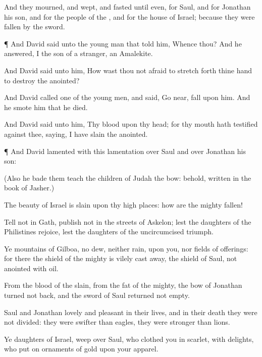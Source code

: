{And they
mourned, and
wept, and
fasted until
even, for
Saul, and for
Jonathan his
son, and for the
people of the
{}, and for the
house of
Israel; because they were
fallen by the
sword.


\par }{\PP {}¶ And
David
said unto the young
man that
told him, Whence
{} thou? And he
answered, I
{} the
son of a
stranger, an
Amalekite.

And
David
said unto him, How wast thou not
afraid to stretch
forth thine
hand to
destroy the
{}
anointed?

And
David
called
one of the young
men, and
said, Go
near,
{}
fall upon him. And he
smote him that he
died.

And
David
said unto him, Thy
blood
{} upon thy
head; for thy
mouth hath
testified against thee,
saying, I have
slain the
{}
anointed.


\par }{\PP {}¶ And
David
lamented with this
lamentation over
Saul and over
Jonathan his
son:

(Also he
bade them
teach the
children of
Judah
{} the
bow: behold,
{}
written in the
book of
Jasher.)

The
beauty of
Israel is
slain upon thy high
places: how are the
mighty
fallen!

Tell
{} not in
Gath,
publish
{} not in the
streets of
Askelon; lest the
daughters of the
Philistines
rejoice, lest the
daughters of the
uncircumcised
triumph.

Ye
mountains of
Gilboa,
{} no
dew, neither
{}
rain, upon you, nor
fields of
offerings: for there the
shield of the
mighty is vilely cast
away, the
shield of
Saul,
{} not
{}
anointed with
oil.

From the
blood of the
slain, from the
fat of the
mighty, the
bow of
Jonathan
turned not
back, and the
sword of
Saul
returned not
empty.

Saul and
Jonathan
{}
lovely and
pleasant in their
lives, and in their
death they were not
divided: they were
swifter than
eagles, they were
stronger than
lions.

Ye
daughters of
Israel, weep
over
Saul, who
clothed you in
scarlet, with
{}
delights, who
put on
ornaments of
gold upon your
apparel.

}
